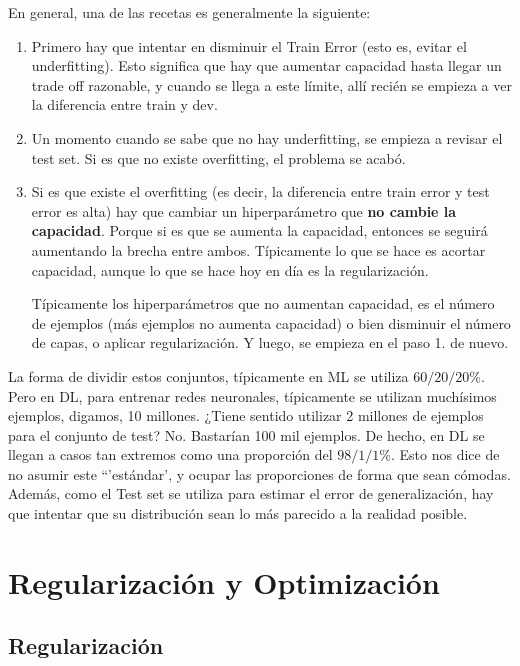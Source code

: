En general, una de las recetas es generalmente la siguiente:
\begin{enumerate}
    \item Primero hay que intentar en disminuir el Train Error (esto es, evitar el underfitting). Esto significa que hay que aumentar capacidad hasta llegar un trade off razonable, y cuando se llega a este límite, allí recién se empieza a ver la diferencia entre train y dev.
    \item Un momento cuando se sabe que no hay underfitting, se empieza a revisar el test set. Si es que no existe overfitting, el problema se acabó. 
    \item Si es que existe el overfitting (es decir, la diferencia entre train error y test error es alta) hay que cambiar un hiperparámetro que \textbf{no cambie la capacidad}. Porque si es que se aumenta la capacidad, entonces se seguirá aumentando la brecha entre ambos. Típicamente lo que se hace es acortar capacidad, aunque lo que se hace hoy en día es la regularización. 
    
    Típicamente los hiperparámetros que no aumentan capacidad, es el número de ejemplos (más ejemplos no aumenta capacidad) o bien disminuir el número de capas, o aplicar regularización. Y luego, se empieza en el paso 1. de nuevo.
\end{enumerate}

La forma de dividir estos conjuntos, típicamente en ML se utiliza $60 / 20 / 20\%$. Pero en DL, para entrenar redes neuronales, típicamente se utilizan muchísimos ejemplos, digamos, 10 millones. ¿Tiene sentido utilizar 2 millones de ejemplos para el conjunto de test? No. Bastarían 100 mil ejemplos. De hecho, en DL se llegan a casos tan extremos como una proporción del $98 / 1 / 1\%$. Esto nos dice de no asumir este ``'estándar', y ocupar las proporciones de forma que sean cómodas. Además, como el Test set se utiliza para estimar el error de generalización, hay que intentar que su distribución sean lo más parecido a la realidad posible. 




\chapter{Regularización y Optimización}

\section{Regularización}


